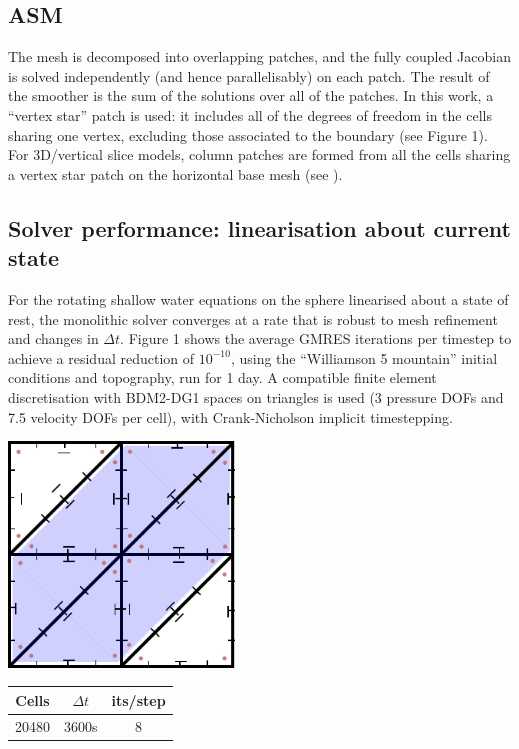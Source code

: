 \documentclass[
]{ImperialPoster}
\begin{document}
\begin{multicols}{3}
  \subsection{ASM} The mesh is decomposed
  into overlapping patches, and the fully coupled Jacobian is solved
  independently (and hence parallelisably) on each patch. The result
  of the smoother is the sum of the solutions over all of the
  patches. In this work, a ``vertex star'' patch is used: it includes
  all of the degrees of freedom in the cells sharing one vertex,
  excluding those associated to the boundary (see Figure 1). For
  3D/vertical slice models, column patches are formed from all the
  cells sharing a vertex star patch on the horizontal base mesh (see
  \cite{cotter2023compatible}).

  \subsection{Solver performance: linearisation about current state}
  For the rotating shallow water equations on the sphere linearised
  about a state of rest, the monolithic solver converges at a rate
  that is robust to mesh refinement and changes in $\Delta t$. Figure
  1 shows the average GMRES iterations per timestep to achieve a
  residual reduction of $10^{-10}$, using the ``Williamson 5
  mountain'' initial conditions and topography, run for 1 day. A
  compatible finite element discretisation with BDM2-DG1 spaces on
  triangles is used (3 pressure DOFs and 7.5 velocity DOFs per cell), with Crank-Nicholson
  implicit timestepping.
  \vspace{-5mm}
  \begin{center}
  \parbox{6.2cm}{
    \vspace{1cm}
  \includegraphics[width=6cm]{Images/patch}}
  \begin{tabular}{ccc}
    Cells & $\Delta t$ & its/step \\
    \hline
    20480 & 3600s & 8 \\

\end{tabular}
\end{center}
\end{multicols}
\end{document}
